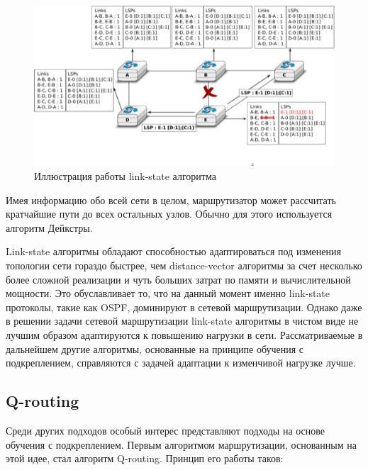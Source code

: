 \documentclass[]{itmo-student-thesis}
\begin{document}
\begin{figure}[!h]
  \caption{Иллюстрация работы link-state алгоритма}\label{ospf-img}
  \centering
  \includegraphics[scale=1.5]{ls-twoway}
\end{figure}

Имея информацию обо всей сети в целом, маршрутизатор может рассчитать кратчайшие
пути до всех остальных узлов. Обычно для этого используется алгоритм
Дейкстры\cite{dijkstra}. 

Link-state алгоритмы обладают способностью адаптироваться под изменения
топологии сети гораздо быстрее, чем distance-vector алгоритмы за счет
несколько более сложной реализации и чуть больших затрат по памяти и
вычислительной мощности. Это обуславливает то, что на данный момент именно
link-state протоколы, такие как OSPF\cite{ospf-rfc}, доминируют в сетевой
маршрутизации. Однако даже в решении задачи сетевой маршрутизации link-state
алгоритмы в чистом виде не лучшим образом адаптируются к повышению нагрузки в
сети. Рассматриваемые в дальнейшем другие алгоритмы, основанные на принципе
обучения с подкреплением, справляются с задачей адаптации к
изменчивой нагрузке лучше.

\subsection{Q-routing}\label{q-routing-desc}

Среди других подходов особый интерес представляют подходы на основе обучения с
подкреплением. Первым алгоритмом маршрутизации, основанным на этой идее, стал
алгоритм Q-routing\cite{q-routing-orig}. Принцип его работы таков:
\end{document}
